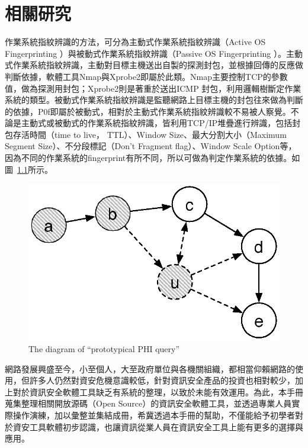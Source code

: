 \renewcommand\thetable{\arabic{chapter}-\arabic{table}}
\renewcommand{\theequation}{\arabic{chapter}-\arabic{equation}}
\chapter{相關研究}

作業系統指紋辨識的方法，可分為主動式作業系統指紋辨識（Active OS Fingerprinting ）與被動式作業系統指紋辨識（Passive OS Fingerprinting ）。主動式作業系統指紋辨識，主動對目標主機送出自製的探測封包，並根據回傳的反應做判斷依據，軟體工具Nmap與Xprobe2即屬於此類。Nmap主要控制TCP的參數值，做為探測用封包；Xprobe2則是著重於送出ICMP 封包，利用邏輯樹斷定作業系統的類型。被動式作業系統指紋辨識是監聽網路上目標主機的封包往來做為判斷的依據，P0f即屬於被動式，相對於主動式作業系統指紋辨識較不易被人察覺。不論是主動式或被動式的作業系統指紋辨識，皆利用TCP/IP堆疊進行辨識，包括封包存活時間（time to live， TTL）、Window Size、最大分割大小（Maximum Segment Size）、不分段標記（Don't Fragment flag）、Window Scale Option等，因為不同的作業系統的fingerprint有所不同，所以可做為判定作業系統的依據。如圖~\ref{fig:PHI}所示。


\begin{figure}[hbtp]
  \begin{center}
    \includegraphics[width=1.0\textwidth]{figures/dyna_rm.eps}
    \caption{The diagram of ``prototypical PHI query''} 
    \label{fig:PHI}
  \end{center}
\end{figure}


網路發展興盛至今，小至個人，大至政府單位與各機關組織，都相當仰賴網路的使用，但許多人仍然對資安危機意識較低，針對資訊安全產品的投資也相對較少，加上對於資訊安全軟體工具缺乏有系統的整理，以致於未能有效運用。為此，本手冊蒐集整理相關開放源碼（Open Source）的資訊安全軟體工具，並透過專業人員實際操作演練，加以彙整並集結成冊，希冀透過本手冊的幫助，不僅能給予初學者對於資安工具軟體初步認識，也讓資訊從業人員在資訊安全工具上能有更多的選擇與應用。

